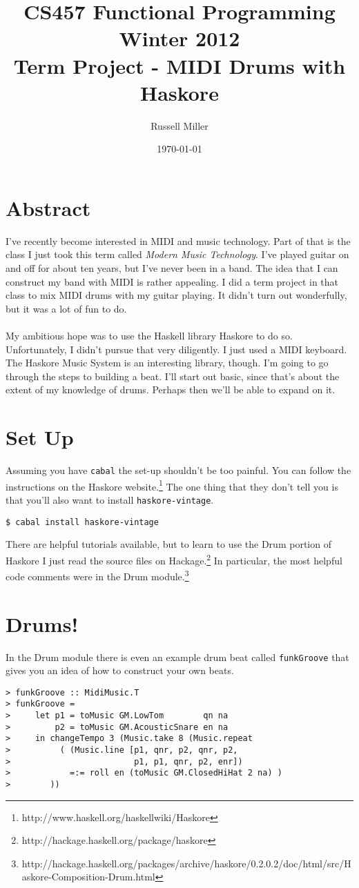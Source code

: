 \documentclass{article}
\title{CS457 Functional Programming\\
Winter 2012\\
Term Project - MIDI Drums with Haskore}
\author{Russell Miller}
\date{\today}
\begin{document}
\lstset{language=Haskell, basicstyle=\ttfamily}

\maketitle

\section*{Abstract}
I've recently become interested in MIDI and music technology. Part
of that is the class I just took this term called \emph{Modern Music
Technology}. I've played guitar on and off for about ten years, but I've
never been in a band. The idea that I can construct my band with MIDI
is rather appealing. I did a term project in that class to mix MIDI drums
with my guitar playing. It didn't turn out wonderfully, but it was a lot of
fun to do.\\
\\
My ambitious hope was to use the Haskell library Haskore to do so.
Unfortunately, I didn't pursue that very diligently. I just used a MIDI
keyboard. The Haskore Music System is an interesting library, though. I'm
going to go through the steps to building a beat. I'll start out basic,
since that's about the extent of my knowledge of drums. Perhaps then we'll
be able to expand on it.

\section*{Set Up}
Assuming you have \lstinline{cabal} the set-up shouldn't be too painful. You
can follow the instructions on the Haskore 
website.\footnote{http://www.haskell.org/haskellwiki/Haskore} The one thing
that they don't tell you is that you'll also want to install 
\lstinline{haskore-vintage}.
\begin{lstlisting}[mathescape=false]
  $ cabal install haskore-vintage
\end{lstlisting}
There are helpful tutorials available, but to learn to use the Drum portion
of Haskore I just read the source files on 
Hackage.\footnote{http://hackage.haskell.org/package/haskore} In particular,
the most helpful code comments were in the Drum 
module.\footnote{http://hackage.haskell.org/packages/archive/haskore/0.2.0.2/doc/html/src/Haskore-Composition-Drum.html}

\section*{Drums!}
In the Drum module there is even an example drum beat called
\lstinline{funkGroove} that gives you an idea of how to construct your own
beats.
\begin{lstlisting}
> funkGroove :: MidiMusic.T
> funkGroove =
>     let p1 = toMusic GM.LowTom        qn na
>         p2 = toMusic GM.AcousticSnare en na
>     in changeTempo 3 (Music.take 8 (Music.repeat
>          ( (Music.line [p1, qnr, p2, qnr, p2,
>                         p1, p1, qnr, p2, enr])
>            =:= roll en (toMusic GM.ClosedHiHat 2 na) )
>        ))
\end{lstlisting}
\end{document}
